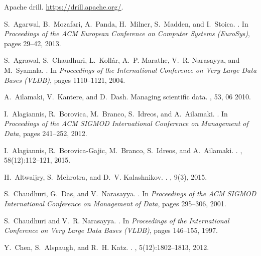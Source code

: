 Apache drill.
\newblock \url{https://drill.apache.org/}.

S.~Agarwal, B.~Mozafari, A.~Panda, H.~Milner, S.~Madden, and I.~Stoica.
.
\newblock In {\em Proceedings of the ACM European Conference on Computer
  Systems (EuroSys)}, pages 29--42, 2013.

S.~Agrawal, S.~Chaudhuri, L.~Koll{\'{a}}r, A.~P. Marathe, V.~R. Narasayya, and
  M.~Syamala.
.
\newblock In {\em Proceedings of the International Conference on Very Large
  Data Bases (VLDB)}, pages 1110--1121, 2004.

A.~Ailamaki, V.~Kantere, and D.~Dash.
\newblock Managing scientific data.
, 53, 06 2010.

I.~Alagiannis, R.~Borovica, M.~Branco, S.~Idreos, and A.~Ailamaki.
.
\newblock In {\em Proceedings of the ACM SIGMOD International Conference on
  Management of Data}, pages 241--252, 2012.

I.~Alagiannis, R.~Borovica-Gajic, M.~Branco, S.~Idreos, and A.~Ailamaki.
.
, 58(12):112--121, 2015.

H.~Altwaijry, S.~Mehrotra, and D.~V. Kalashnikov.
.
, 9(3), 2015.

S.~Chaudhuri, G.~Das, and V.~Narasayya.
.
\newblock In {\em Proceedings of the ACM SIGMOD International Conference on
  Management of Data}, pages 295--306, 2001.

S.~Chaudhuri and V.~R. Narasayya.
.
\newblock In {\em Proceedings of the International Conference on Very Large
  Data Bases (VLDB)}, pages 146--155, 1997.

Y.~Chen, S.~Alspaugh, and R.~H. Katz.
.
, 5(12):1802--1813, 2012.

